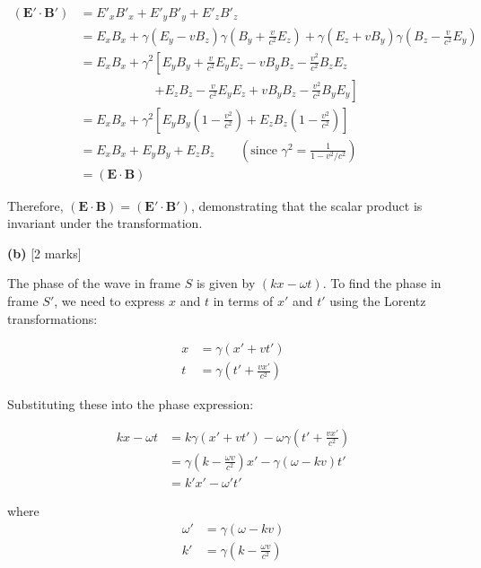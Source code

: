 \documentclass{article}
\begin{document}
\begin{align*}
(\mathbf{E'} \cdot \mathbf{B'}) &= E'_x B'_x + E'_y B'_y + E'_z B'_z \\
&= E_x B_x + \gamma (E_y - v B_z) \gamma \left( B_y + \frac{v}{c^2} E_z \right) + \gamma (E_z + v B_y) \gamma \left( B_z - \frac{v}{c^2} E_y \right) \\
&= E_x B_x + \gamma^2 \left[ E_y B_y + \frac{v}{c^2} E_y E_z - v B_y B_z - \frac{v^2}{c^2} B_z E_z  \right. \\
&\qquad \qquad \qquad \left. + E_z B_z - \frac{v}{c^2} E_y E_z + v B_y B_z - \frac{v^2}{c^2} B_y E_y \right] \\
&= E_x B_x + \gamma^2 \left[ E_y B_y \left( 1 - \frac{v^2}{c^2} \right) + E_z B_z \left( 1 - \frac{v^2}{c^2} \right) \right] \\
&= E_x B_x + E_y B_y + E_z B_z \qquad \left( \text{since } \gamma^2 = \frac{1}{1 - v^2/c^2} \right) \\
&= (\mathbf{E} \cdot \mathbf{B})
\end{align*}

Therefore, $(\mathbf{E} \cdot \mathbf{B}) = (\mathbf{E'} \cdot \mathbf{B'})$, demonstrating that the scalar product is invariant under the transformation.

\textbf{(b)} [2 marks]

The phase of the wave in frame $S$ is given by $(kx - \omega t)$. To find the phase in frame $S'$, we need to express $x$ and $t$ in terms of $x'$ and $t'$ using the Lorentz transformations:

\begin{align*}
x &= \gamma (x' + vt') \\
t &= \gamma \left( t' + \frac{vx'}{c^2} \right)
\end{align*}

Substituting these into the phase expression:

\begin{align*}
kx - \omega t &= k \gamma (x' + vt') - \omega \gamma \left( t' + \frac{vx'}{c^2} \right) \\
&= \gamma \left( k - \frac{\omega v}{c^2} \right) x' - \gamma (\omega - kv) t' \\
&= k' x' - \omega' t'
\end{align*}

where 
\begin{align*}
\omega' &= \gamma (\omega - k v) \\
k' &= \gamma \left( k - \frac{\omega v}{c^2} \right)
\end{align*}
\end{document}
